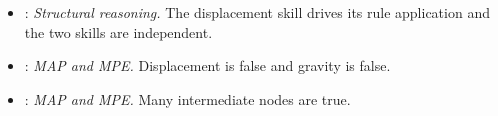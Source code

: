 \begingroup\raggedright
\begin{itemize}[nosep,leftmargin=*]
\item {}: \emph{Structural reasoning.}  The displacement skill drives its rule application and the two skills are independent.
\item {}: \emph{MAP and MPE.}  Displacement is false and gravity is false.
\item {}: \emph{MAP and MPE.}  Many intermediate nodes are true.
\end{itemize}
\endgroup
